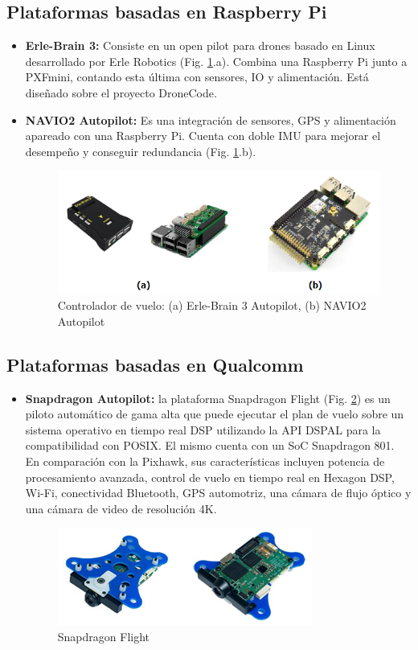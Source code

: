 \subsection{Plataformas basadas en Raspberry Pi}
\begin{itemize}
    \item \textbf{Erle-Brain 3:} Consiste en un open pilot para drones basado en Linux desarrollado por Erle Robotics (Fig. \ref{fig:raspi}.a). Combina una Raspberry Pi junto a PXFmini, contando esta última con sensores, IO y alimentación. Está diseñado sobre el proyecto DroneCode.
    \item \textbf{NAVIO2 Autopilot:} Es una integración de sensores, GPS y alimentación apareado con una Raspberry Pi. Cuenta con doble IMU para mejorar el desempeño y conseguir redundancia (Fig. \ref{fig:raspi}.b).
    
    \begin{figure}[!ht]
        \centering
        \includegraphics[width=.95\textwidth]{Img/raspi}
        \caption{Controlador de vuelo: (a) Erle-Brain 3 Autopilot, (b) NAVIO2 Autopilot}
        \label{fig:raspi}
    \end{figure}
\end{itemize}

\subsection{Plataformas basadas en Qualcomm}
\begin{itemize}
    \item \textbf{Snapdragon Autopilot:} la plataforma Snapdragon Flight (Fig. \ref{fig:snapdragon}) es un piloto automático de gama alta que puede ejecutar el plan de vuelo sobre un sistema operativo en tiempo real DSP utilizando la API DSPAL para la compatibilidad con POSIX. El mismo cuenta con un SoC Snapdragon 801. En comparación con la Pixhawk, sus características incluyen potencia de procesamiento avanzada, control de vuelo en tiempo real en Hexagon DSP, Wi-Fi, conectividad Bluetooth, GPS automotriz, una cámara de flujo óptico y una cámara de video de resolución 4K.    
    \begin{figure}[!ht]
        \centering
        \includegraphics[width=.55\textwidth]{Img/snapdragon}
        \caption{Snapdragon Flight}
        \label{fig:snapdragon}
    \end{figure}
\end{itemize}

